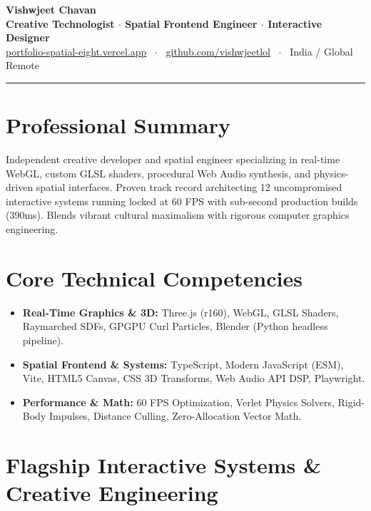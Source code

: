 \documentclass[10pt,a4paper]{article}
\begin{document}
\begin{center}
    {\LARGE \textbf{Vishwjeet Chavan}} \\[4pt]
    \textbf{Creative Technologist $\cdot$ Spatial Frontend Engineer $\cdot$ Interactive Designer} \\[3pt]
    \href{https://portfolio-spatial-eight.vercel.app}{portfolio-spatial-eight.vercel.app} \ $\cdot$ \ 
    \href{https://github.com/vishwjeetlol}{github.com/vishwjeetlol} \ $\cdot$ \ 
    India / Global Remote
\end{center}

\vspace{4pt}
\hrule
\vspace{6pt}

\section*{Professional Summary}
Independent creative developer and spatial engineer specializing in real-time WebGL, custom GLSL shaders, procedural Web Audio synthesis, and physics-driven spatial interfaces. Proven track record architecting 12 uncompromised interactive systems running locked at 60 FPS with sub-second production builds (390ms). Blends vibrant cultural maximalism with rigorous computer graphics engineering.

\section*{Core Technical Competencies}
\begin{itemize}[leftmargin=12pt, itemsep=1pt]
    \item \textbf{Real-Time Graphics \& 3D:} Three.js (r160), WebGL, GLSL Shaders, Raymarched SDFs, GPGPU Curl Particles, Blender (Python headless pipeline).
    \item \textbf{Spatial Frontend \& Systems:} TypeScript, Modern JavaScript (ESM), Vite, HTML5 Canvas, CSS 3D Transforms, Web Audio API DSP, Playwright.
    \item \textbf{Performance \& Math:} 60 FPS Optimization, Verlet Physics Solvers, Rigid-Body Impulses, Distance Culling, Zero-Allocation Vector Math.
\end{itemize}

\section*{Flagship Interactive Systems \& Creative Engineering}
\end{document}
